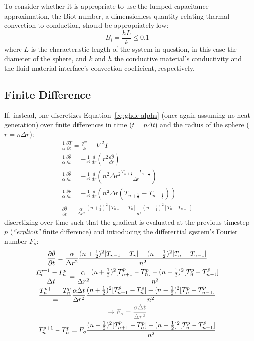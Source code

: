 \documentclass[12pt]{article}
\begin{document}
To consider whether it is appropriate to use the lumped capacitance approximation, the Biot number, a dimensionless quantity relating thermal convection to conduction, should be appropriately low:
\begin{equation}
    \label{eq:biot}
    B_i=\frac{hL}{k}\leq0.1
\end{equation}
where $L$ is the characteristic length of the system in question, in this case the diameter of the sphere, and $k$ and $h$ the conductive material's conductivity and the fluid-material interface's convection coefficient, respectively.

\FloatBarrier\subsection{Finite Difference}
If, instead, one discretizes Equation~\ref{eq:ghde-alpha} (once again assuming no heat generation) over finite differences in time ($t=p\Delta t$) and the radius of the sphere ($r=n\Delta r$):
\newcommand{\btheta}{\bar{\theta}}
\begin{gather*}
    \frac{1}{\alpha}\frac{\partial T}{\partial t} = \frac{q'''}{k} - \nabla^2T\\
    \frac{1}{\alpha}\frac{\partial \btheta}{\partial t} = - \frac{1}{r^2}\frac{d}{dr}\left(r^2\frac{d\btheta}{dr}\right)\\
    \frac{1}{\alpha}\frac{\partial \btheta}{\partial t} = - \frac{1}{r^2}\frac{d}{dr}\left(n^2\Delta r^2\frac{T_{n+\frac{1}{2}} - T_{n-\frac{1}{2}}}{\Delta r}\right)\\
    \frac{1}{\alpha}\frac{\partial \btheta}{\partial t} = - \frac{1}{r^2}\frac{d}{dr}\left(n^2\Delta r({T_{n+\frac{1}{2}} - T_{n-\frac{1}{2}}})\right)\\
    \frac{\partial \btheta}{\partial t} = \frac{\alpha}{\Delta r^2} \frac{(n+\frac{1}{2})^2[T_{n+1}-T_n] - (n-\frac{1}{2})^2[T_n-T_{n-1}]}{n^2}
\end{gather*}
discretizing over time such that the gradient is evaluated at the previous timestep $p$ (\emph{``explicit''} finite difference) and introducing the differential system's Fourier number $F_o$:
\begin{gather*}
    \frac{\partial \btheta}{\partial t} = \frac{\alpha}{\Delta r^2} \frac{(n+\frac{1}{2})^2[T_{n+1}-T_n] - (n-\frac{1}{2})^2[T_n-T_{n-1}]}{n^2}\\
    \frac{T_n^{p+1} - T_n^p}{\Delta t} = \frac{\alpha}{\Delta r^2} \frac{(n+\frac{1}{2})^2[T_{n+1}^p-T_n^p] - (n-\frac{1}{2})^2[T_n^p-T_{n-1}^p]}{n^2}\\
    \frac{T_n^{p+1} - T_n^p} = \frac{\alpha\Delta t}{\Delta r^2} \frac{(n+\frac{1}{2})^2[T_{n+1}^p-T_n^p] - (n-\frac{1}{2})^2[T_n^p-T_{n-1}^p]}{n^2}\\
    \color{gray}\rightarrow F_o = \frac{\alpha \Delta t}{\Delta r^2}\\
    {T_n^{p+1} - T_n^p} = F_o \frac{(n+\frac{1}{2})^2[T_{n+1}^p-T_n^p] - (n-\frac{1}{2})^2[T_n^p-T_{n-1}^p]}{n^2}
\end{gather*}
\end{document}
